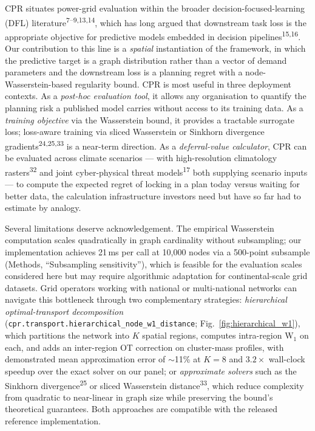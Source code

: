 \documentclass[10pt,a4paper]{article}
\begin{document}
CPR situates power-grid evaluation within the broader
decision-focused-learning (DFL) literature\textsuperscript{7--9,13,14},
which has long argued that downstream task loss is the appropriate
objective for predictive models embedded in decision
pipelines\textsuperscript{15,16}. Our contribution to this line is a
\textit{spatial} instantiation of the framework, in which the
predictive target is a graph distribution rather than a vector of
demand parameters and the downstream loss is a planning regret with
a node-Wasserstein-based regularity bound. CPR is most useful in
three deployment contexts. As a \emph{post-hoc evaluation tool}, it
allows any organisation to quantify the planning risk a published
model carries without access to its training data. As a
\emph{training objective} via the Wasserstein bound, it provides a
tractable surrogate loss; loss-aware training via sliced Wasserstein
or Sinkhorn divergence gradients\textsuperscript{24,25,33} is a
near-term direction. As a \emph{deferral-value calculator}, CPR can
be evaluated across climate scenarios --- with high-resolution
climatology rasters\textsuperscript{32} and joint cyber-physical
threat models\textsuperscript{17} both supplying scenario inputs ---
to compute the expected regret of locking in a plan today versus
waiting for better data, the calculation infrastructure investors
need but have so far had to estimate by analogy.

Several limitations deserve acknowledgement. The empirical
Wasserstein computation scales quadratically in graph cardinality
without subsampling; our implementation achieves 21\,ms per call
at 10,000 nodes via a 500-point subsample (Methods, ``Subsampling
sensitivity''), which is feasible for the evaluation scales
considered here but may require algorithmic adaptation for
continental-scale grid datasets. Grid operators working with
national or multi-national networks can navigate this bottleneck
through two complementary strategies: \emph{hierarchical
optimal-transport decomposition}
(\texttt{cpr.transport.hierarchical\_node\_w1\_distance};
Fig.~\ref{fig:hierarchical_w1}), which partitions the network into
$K$ spatial regions, computes intra-region W$_1$ on each, and
adds an inter-region OT correction on cluster-mass profiles, with
demonstrated mean approximation error of $\sim$11\% at $K = 8$ and
$3.2\times$ wall-clock speedup over the exact solver on our panel;
or \emph{approximate solvers} such as the
Sinkhorn divergence\textsuperscript{25} or sliced Wasserstein
distance\textsuperscript{33}, which reduce complexity from
quadratic to near-linear in graph size while preserving the
bound's theoretical guarantees. Both approaches are compatible
with the released reference
implementation.
\end{document}
